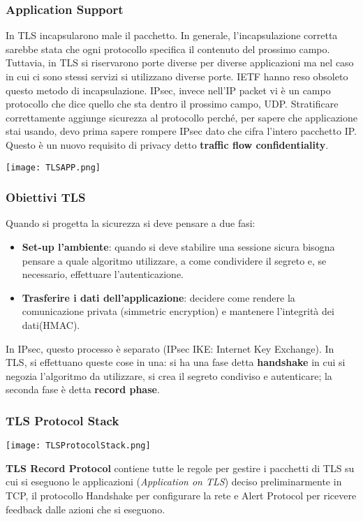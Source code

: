 \documentclass{article}
\theoremstyle{remark}
\begin{document}
\subsubsection{Application Support}
In TLS incapsularono male il pacchetto. In generale, l'incapsulazione corretta sarebbe stata che ogni protocollo specifica il contenuto del prossimo campo. Tuttavia, in TLS si riservarono porte diverse per diverse applicazioni ma nel caso in cui ci sono stessi servizi si utilizzano diverse porte. IETF hanno reso obsoleto questo metodo di incapsulazione.
IPsec, invece nell'IP packet vi è un campo protocollo che dice quello che sta dentro il prossimo campo, UDP.\newline
Stratificare correttamente aggiunge sicurezza al protocollo perché, per sapere che applicazione stai usando, devo prima sapere rompere IPsec dato che cifra l'intero pacchetto IP. Questo è un nuovo requisito di privacy detto \textbf{traffic flow confidentiality}.
\begin{center}
    \texttt{[image: TLSAPP.png]}
\end{center}
\subsubsection{Obiettivi TLS}
Quando si progetta la sicurezza si deve pensare a due fasi:\begin{itemize}
    \item \textbf{Set-up l'ambiente}: quando si deve stabilire una sessione sicura bisogna pensare a quale algoritmo utilizzare, a come condividere il segreto e, se necessario, effettuare l'autenticazione.
    \item \textbf{Trasferire i dati dell'applicazione}: decidere come rendere la comunicazione privata (simmetric encryption) e mantenere l'integrità dei dati(HMAC).
\end{itemize}
In IPsec, questo processo è separato (IPsec IKE: Internet Key Exchange). In TLS, si effettuano queste cose in una: si ha una fase detta \textbf{handshake} in cui si negozia l'algoritmo da utilizzare, si crea il segreto condiviso e autenticare; la seconda fase è detta \textbf{record phase}.
\subsubsection{TLS Protocol Stack}
\begin{center}
    \texttt{[image: TLSProtocolStack.png]}
\end{center}
\textbf{TLS Record Protocol} contiene tutte le regole per gestire i pacchetti di TLS su cui si eseguono le applicazioni (\emph{Application on TLS}) deciso preliminarmente in TCP, il protocollo Handshake per configurare la rete e Alert Protocol per ricevere feedback dalle azioni che si eseguono.
\end{document}
